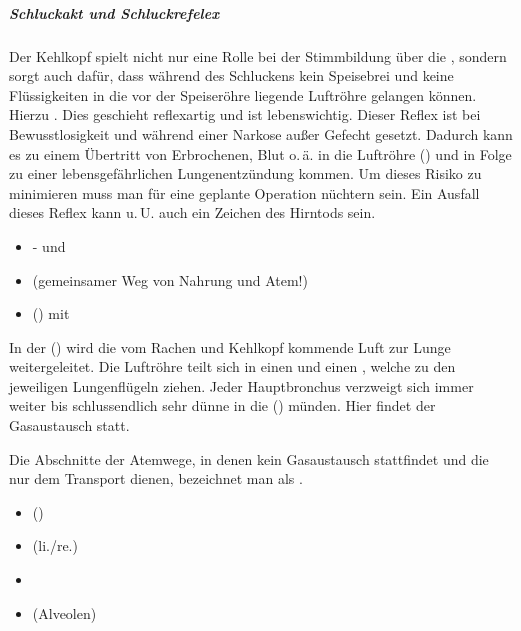 {\subparagraph{Schluckakt und Schluckrefelex}
Der Kehlkopf spielt nicht nur eine Rolle bei der
Stimmbildung über die , sondern sorgt auch dafür,
dass während des Schluckens kein Speisebrei und keine
Flüssigkeiten in die vor der Speiseröhre liegende Luftröhre
gelangen können. Hierzu .
Dies geschieht reflexartig und ist lebenswichtig.
Dieser Reflex ist bei Bewusstlosigkeit und während einer
Narkose außer Gefecht gesetzt.
Dadurch kann es zu einem Übertritt von
Erbrochenen, Blut o.\,ä. in die Luftröhre
() und in Folge zu einer lebensgefährlichen
Lungenentzündung kommen.
Um dieses Risiko zu minimieren muss man für eine
geplante Operation nüchtern sein.
Ein Ausfall dieses Reflex kann u.\,U. auch ein Zeichen des
Hirntods sein.



}{%
\begin{itemize}
    \item {}- und   
    \item {} (gemeinsamer Weg von Nahrung und
    Atem!)  
    \item {} () mit
       
\end{itemize}
}{}{}{}

{%
\label{topic:alveolen}
In der  () wird die vom Rachen und
Kehlkopf kommende Luft zur Lunge weitergeleitet. Die
Luftröhre teilt sich in einen  und einen
 , welche zu den jeweiligen
Lungenflügeln ziehen. Jeder Hauptbronchus verzweigt sich
immer weiter bis schlussendlich sehr dünne  in
die  () münden. Hier findet
der Gasaustausch statt.

Die Abschnitte der Atemwege, in denen kein Gasaustausch
stattfindet und die nur dem Transport dienen, bezeichnet man
als .
}{%
\begin{itemize}
    \item {}
    ()
    \item {} (li./re.)
    \item {}
    \item {}
    ({Alveolen})
\end{itemize}
}{}{}{}



